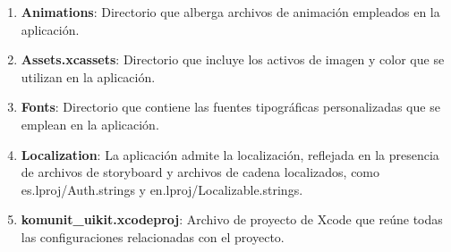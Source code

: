 \begin{enumerate}
        \item \textbf{Animations}: Directorio que alberga archivos de animación empleados en la aplicación.
        \item \textbf{Assets.xcassets}: Directorio que incluye los activos de imagen y color que se utilizan en la aplicación.
        \item \textbf{Fonts}: Directorio que contiene las fuentes tipográficas personalizadas que se emplean en la aplicación.
        \item \textbf{Localization}: La aplicación admite la localización, reflejada en la presencia de archivos de storyboard y archivos de cadena localizados, como es.lproj/Auth.strings y en.lproj/Localizable.strings.
        \item \textbf{komunit\_uikit.xcodeproj}: Archivo de proyecto de Xcode que reúne todas las configuraciones relacionadas con el proyecto.
\end{enumerate}






